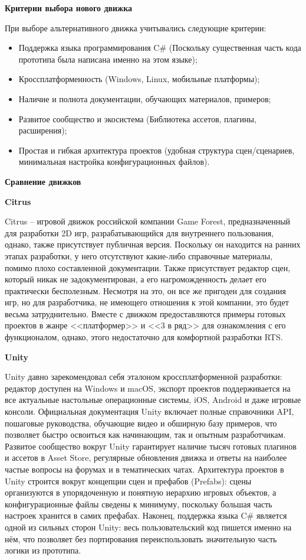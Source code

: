         \textbf{Критерии выбора нового движка}

        При выборе альтернативного движка учитывались следующие критерии:
        \begin{itemize}
            \item Поддержка языка программирования C\# (Поскольку существенная часть кода прототипа была написана именно на этом языке);
            \item Кроссплатформенность (Windows, Linux, мобильные платформы);
            \item Наличие и полнота документации, обучающих материалов, примеров;
            \item Развитое сообщество и экосистема (Библиотека ассетов, плагины, расширения);
            \item Простая и гибкая архитектура проектов (удобная структура сцен/сценариев, минимальная настройка конфигурационных файлов).
        \end{itemize}


        \textbf{Сравнение движков}

        \textbf{Citrus}

        Citrus -- игровой движок российской компании Game Forest, предназначенный для разработки 2D игр, 
        разрабатывающийся для внутреннего пользования, однако, также присутствует публичная версия. Поскольку он находится на ранних этапах разработки, 
        у него отсутствуют какие-либо справочные материалы, помимо плохо составленной документации. Также присутствует редактор сцен, который никак не 
        задокументирован, а его нагроможденность делает его практически бесполезным. Несмотря на это, он все же пригоден для создания игр, 
        но для разработчика, не имеющего отношения к этой компании, это будет весьма затруднительно. Вместе с движком предоставляются примеры готовых проектов 
        в жанре <<платформер>> и <<3 в ряд>> для ознакомления с его функционалом, однако, этого недостаточно для комфортной разработки RTS.

        \textbf{Unity}

        Unity давно зарекомендовал себя эталоном кроссплатформенной разработки: редактор доступен на Windows и macOS, экспорт проектов поддерживается на все актуальные настольные 
        операционные системы, iOS, Android и даже игровые консоли. Официальная документация Unity включает полные справочники API, пошаговые руководства, 
        обучающие видео и обширную базу примеров, что позволяет быстро освоиться как начинающим, так и опытным разработчикам. Развитое сообщество вокруг Unity гарантирует 
        наличие тысяч готовых плагинов и ассетов в Asset Store, регулярные обновления движка и ответы на наиболее частые вопросы на форумах и в тематических чатах. Архитектура проектов 
        в Unity строится вокруг концепции сцен и префабов (Prefabs): сцены организуются в упорядоченную и понятную иерархию игровых объектов, а конфигурационные файлы сведены к минимуму, 
        поскольку большая часть настроек хранится в самих префабах. Наконец, поддержка языка C\# является одной из сильных сторон Unity: весь пользовательский код пишется 
        именно на нём, что позволяет без портирования переиспользовать значительную часть логики из прототипа.
        
